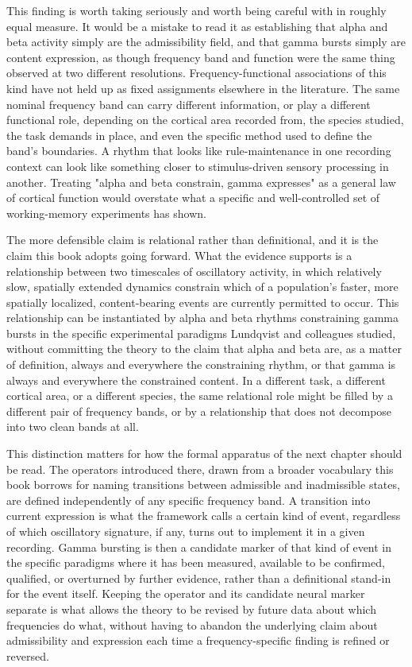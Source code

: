 \documentclass[11pt]{book}
\begin{document}
This finding is worth taking seriously and worth being careful with in roughly equal measure. It would be a mistake to read it as establishing that alpha and beta activity simply are the admissibility field, and that gamma bursts simply are content expression, as though frequency band and function were the same thing observed at two different resolutions. Frequency-functional associations of this kind have not held up as fixed assignments elsewhere in the literature. The same nominal frequency band can carry different information, or play a different functional role, depending on the cortical area recorded from, the species studied, the task demands in place, and even the specific method used to define the band's boundaries. A rhythm that looks like rule-maintenance in one recording context can look like something closer to stimulus-driven sensory processing in another. Treating "alpha and beta constrain, gamma expresses" as a general law of cortical function would overstate what a specific and well-controlled set of working-memory experiments has shown.

The more defensible claim is relational rather than definitional, and it is the claim this book adopts going forward. What the evidence supports is a relationship between two timescales of oscillatory activity, in which relatively slow, spatially extended dynamics constrain which of a population's faster, more spatially localized, content-bearing events are currently permitted to occur. This relationship can be instantiated by alpha and beta rhythms constraining gamma bursts in the specific experimental paradigms Lundqvist and colleagues studied, without committing the theory to the claim that alpha and beta are, as a matter of definition, always and everywhere the constraining rhythm, or that gamma is always and everywhere the constrained content. In a different task, a different cortical area, or a different species, the same relational role might be filled by a different pair of frequency bands, or by a relationship that does not decompose into two clean bands at all.

This distinction matters for how the formal apparatus of the next chapter should be read. The operators introduced there, drawn from a broader vocabulary this book borrows for naming transitions between admissible and inadmissible states, are defined independently of any specific frequency band. A transition into current expression is what the framework calls a certain kind of event, regardless of which oscillatory signature, if any, turns out to implement it in a given recording. Gamma bursting is then a candidate marker of that kind of event in the specific paradigms where it has been measured, available to be confirmed, qualified, or overturned by further evidence, rather than a definitional stand-in for the event itself. Keeping the operator and its candidate neural marker separate is what allows the theory to be revised by future data about which frequencies do what, without having to abandon the underlying claim about admissibility and expression each time a frequency-specific finding is refined or reversed.
\end{document}
